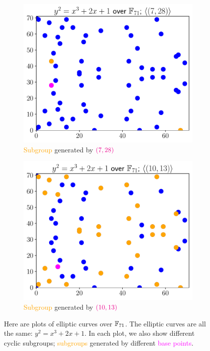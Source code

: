 \begin{figure}[p]
    \begin{subfigure}[t]{0.45\textwidth}
    \includegraphics[width=\textwidth]{plots/ec_finite/ec_finite_F_71_2_1_subgroup_7_28.pdf}
    \caption{\textcolor{orange}{Subgroup} generated by
        $\color{magenta}\left( 7,28 \right)$}
    \label{fig:ec_finite_plots_subgroups_7_28}
    \end{subfigure}
    \begin{subfigure}[t]{0.45\textwidth}
    \includegraphics[width=\textwidth]{plots/ec_finite/ec_finite_F_71_2_1_subgroup_10_13.pdf}
    \caption{\textcolor{orange}{Subgroup} generated by
        $\color{magenta}\left( 10,13 \right)$}
    \label{fig:ec_finite_plots_subgroups_10_13}
    \end{subfigure}
    \caption[Plots of subgroups of elliptic curves over finite fields]{Here
        are plots of \glspl{elliptic curve} over $\mathbb{F}_{71}$.
        The \glspl{elliptic curve} are all the same: $y^{2} = x^{3} + 2x + 1$.
        In each plot, we also show different cyclic subgroups;
        \textcolor{orange}{subgroups} generated by different
        \textcolor{magenta}{base points}.}
    \label{fig:ec_finite_plots_subgroups}
\end{figure}
